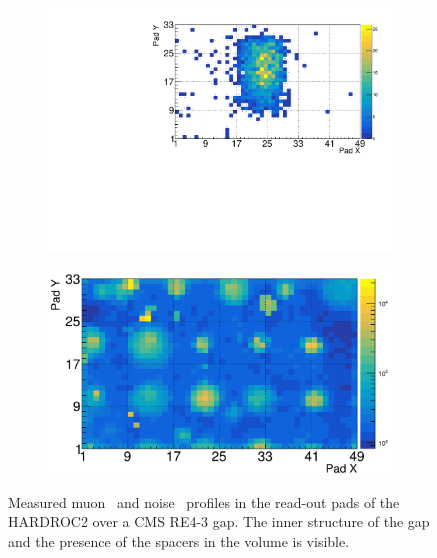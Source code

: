 	\begin{figure}[H]
		\begin{subfigure}{.5\linewidth}
		    \centering
			\includegraphics[width = \linewidth]{fig/chapt6/Muon-Profile-RE4-HARDROC.pdf}
			\caption{\label{fig:HARDROC2-profiles:A}}
		\end{subfigure}
		\begin{subfigure}{.5\linewidth}
		    \centering
			\includegraphics[width = \linewidth]{fig/chapt6/Noise-Profile-RE4-HARDROC.pdf}
			\caption{\label{fig:HARDROC2-profiles:B}}
		\end{subfigure}
		\caption{\label{fig:HARDROC2-profiles} Measured muon~ and noise~ profiles in the read-out pads of the HARDROC2 over a CMS RE4-3 gap. The inner structure of the gap and the presence of the spacers in the volume is visible.}
    \end{figure}
	
